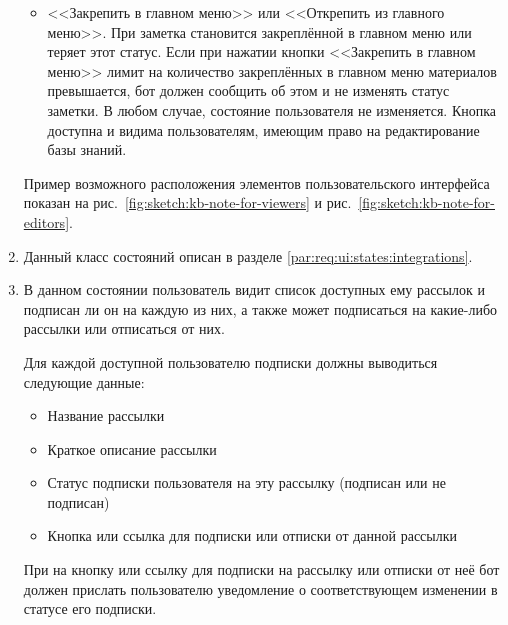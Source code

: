 \begin{enumerate}
\begin{itemize}
                \item
                    <<Закрепить в главном меню>> или <<Открепить из главного меню>>.
                    При  заметка становится закреплённой в главном меню или теряет этот
                    статус. Если при нажатии кнопки <<Закрепить в главном меню>> лимит на количество
                    закреплённых в главном меню материалов превышается, бот должен сообщить об
                    этом и не изменять статус заметки. В любом случае, состояние пользователя
                    не изменяется.
                    Кнопка доступна и видима пользователям, имеющим право на редактирование базы знаний.
            \end{itemize}

            Пример возможного расположения элементов пользовательского интерфейса показан на
            рис.~\ref{fig:sketch:kb-note-for-viewers} и
            рис.~\ref{fig:sketch:kb-note-for-editors}.

        \item \label{itm:req:ui:states:integrationx}

            Данный класс состояний описан в разделе \ref{par:req:ui:states:integrations}.

        \item \label{itm:req:ui:states:subscriptions}

            В данном состоянии пользователь видит список доступных ему рассылок и подписан ли
            он на каждую из них, а также может подписаться на какие-либо рассылки или отписаться
            от них.

            Для каждой доступной пользователю подписки должны выводиться
            следующие данные:
            \begin{itemize}
                \item
                    Название рассылки
                \item
                    Краткое описание рассылки
                \item
                    Статус подписки пользователя на эту рассылку (подписан или не подписан)
                \item
                    Кнопка или ссылка для подписки или отписки от данной рассылки
            \end{itemize}

            При  на кнопку или ссылку для подписки на рассылку или отписки от неё
            бот должен прислать пользователю уведомление о соответствующем изменении в статусе
            его подписки.


\end{enumerate}
